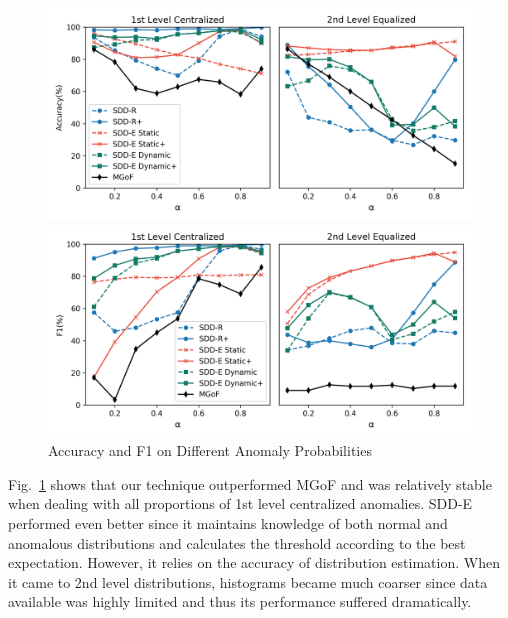 \documentclass[10pt,conference,letterpaper]{article}
\begin{document}
			\begin{figure}[!t]
				\includegraphics[width=\linewidth]{fig/AccuracyOnAnomalyProbability.png}
				
				\includegraphics[width=\linewidth]{fig/F1OnAnomalyProbability.png}
				\caption{Accuracy and F1 on Different Anomaly Probabilities}
				\label{fig:anomaly-probability}
			\end{figure}
			
			Fig.~\ref{fig:anomaly-probability} shows that our technique outperformed MGoF and was relatively stable when dealing with all proportions of 1st level centralized anomalies. SDD-E performed even better since it maintains knowledge of both normal and anomalous distributions and calculates the threshold according to the best expectation. However, it relies on the accuracy of distribution estimation. When it came to 2nd level distributions, histograms became much coarser since data available was highly limited and thus its performance suffered dramatically.
			
\end{document}
